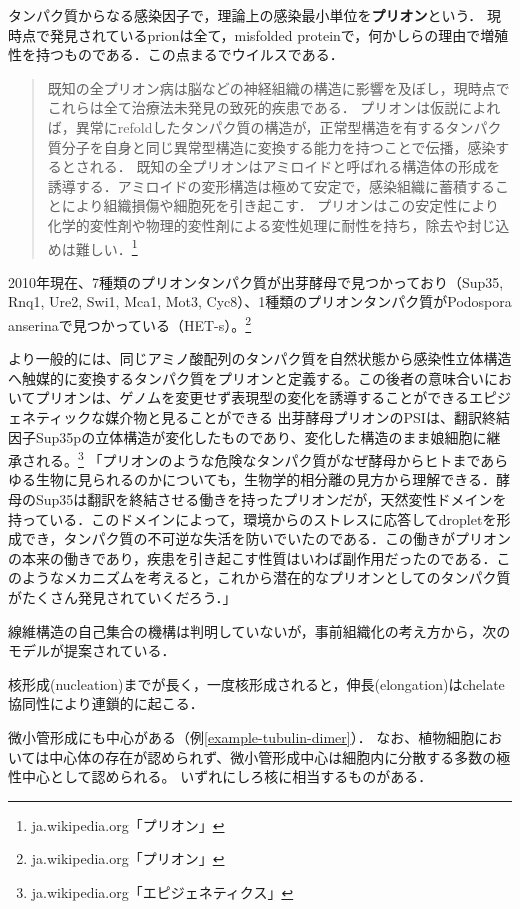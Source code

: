 \documentclass[uplatex, dvipdfmx]{jsreport}
\begin{document}
\begin{definition}[prion]
    タンパク質からなる感染因子で，理論上の感染最小単位を\textbf{プリオン}という．
    現時点で発見されているprionは全て，misfolded proteinで，何かしらの理由で増殖性を持つものである．この点まるでウイルスである．
    \begin{quote}
    既知の全プリオン病は脳などの神経組織の構造に影響を及ぼし，現時点でこれらは全て治療法未発見の致死的疾患である．
    プリオンは仮説によれば，異常にrefoldしたタンパク質の構造が，正常型構造を有するタンパク質分子を自身と同じ異常型構造に変換する能力を持つことで伝播，感染するとされる．
    既知の全プリオンはアミロイドと呼ばれる構造体の形成を誘導する．アミロイドの変形構造は極めて安定で，感染組織に蓄積することにより組織損傷や細胞死を引き起こす．
    プリオンはこの安定性により化学的変性剤や物理的変性剤による変性処理に耐性を持ち，除去や封じ込めは難しい．\footnote{ja.wikipedia.org「プリオン」}
    \end{quote}
\end{definition}
\begin{example}
    2010年現在、7種類のプリオンタンパク質が出芽酵母で見つかっており（Sup35, Rnq1, Ure2, Swi1, Mca1, Mot3, Cyc8）、1種類のプリオンタンパク質がPodospora anserinaで見つかっている（HET-s）。\footnote{ja.wikipedia.org「プリオン」}
\end{example}
\begin{remark}
    より一般的には、同じアミノ酸配列のタンパク質を自然状態から感染性立体構造へ触媒的に変換するタンパク質をプリオンと定義する。この後者の意味合いにおいてプリオンは、ゲノムを変更せず表現型の変化を誘導することができるエピジェネティックな媒介物と見ることができる
    出芽酵母プリオンのPSIは、翻訳終結因子Sup35pの立体構造が変化したものであり、変化した構造のまま娘細胞に継承される。\footnote{ja.wikipedia.org「エピジェネティクス」}
    「プリオンのような危険なタンパク質がなぜ酵母からヒトまであらゆる生物に見られるのかについても，生物学的相分離の見方から理解できる．酵母のSup35は翻訳を終結させる働きを持ったプリオンだが，天然変性ドメインを持っている．このドメインによって，環境からのストレスに応答してdropletを形成でき，タンパク質の不可逆な失活を防いでいたのである．この働きがプリオンの本来の働きであり，疾患を引き起こす性質はいわば副作用だったのである．このようなメカニズムを考えると，これから潜在的なプリオンとしてのタンパク質がたくさん発見されていくだろう．」\cite{白木賢太郎}
\end{remark}

線維構造の自己集合の機構は判明していないが，事前組織化の考え方から，次のモデルが提案されている．
\begin{model}
    核形成(nucleation)までが長く，一度核形成されると，伸長(elongation)はchelate協同性により連鎖的に起こる．
\end{model}
\begin{example}[中心体]
    微小管形成にも中心がある（例\ref{example-tubulin-dimer}）．
    なお、植物細胞においては中心体の存在が認められず、微小管形成中心は細胞内に分散する多数の極性中心として認められる。
    いずれにしろ核に相当するものがある．
\end{example}
\end{document}

